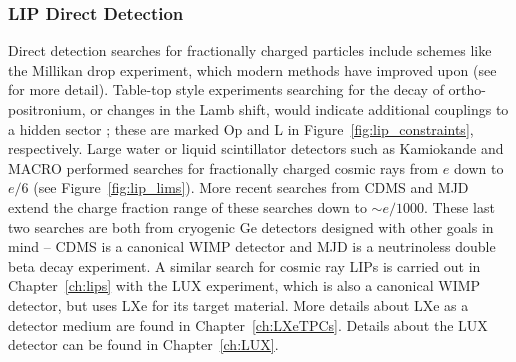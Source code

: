 \subsubsection{LIP Direct Detection}
Direct detection searches for fractionally charged particles include schemes like the Millikan drop experiment, which modern methods have improved upon (see \cite{Perl2009} for more detail). Table-top style experiments searching for the decay of ortho-positronium, or changes in the Lamb shift, would indicate additional couplings to a hidden sector \cite{Perl2009}; these are marked Op and L in Figure~\ref{fig:lip_constraints}, respectively. Large water or liquid scintillator detectors such as Kamiokande and MACRO performed searches for fractionally charged cosmic rays from $e$ down to $e/6$ (see Figure~\ref{fig:lip_lims}). More recent searches from \ac{CDMS} and \ac{MJD} extend the charge fraction range of these searches down to $\sim e/1000$. These last two searches are both from cryogenic Ge detectors designed with other goals in mind -- \ac{CDMS} is a canonical \ac{WIMP} detector and \ac{MJD} is a neutrinoless double beta decay experiment. A similar search for cosmic ray \ac{LIP}s is carried out in Chapter~\ref{ch:lips} with the \ac{LUX} experiment, which is also a canonical \ac{WIMP} detector, but uses \ac{LXe} for its target material. More details about \ac{LXe} as a detector medium are found in Chapter~\ref{ch:LXeTPCs}. Details about the \ac{LUX} detector can be found in Chapter~\ref{ch:LUX}.




